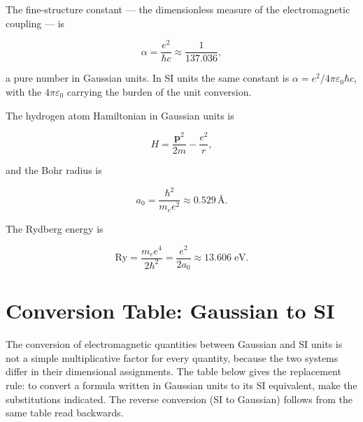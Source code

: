 The fine-structure constant --- the dimensionless measure of the electromagnetic coupling --- is
\begin{linenomath}
    \begin{equation}
        \alpha = \frac{e^2}{\hbar c} \approx \frac{1}{137.036},
        \label{eq:alpha-gaussian}
    \end{equation}
\end{linenomath}
a pure number in Gaussian units. In SI units the same constant is $\alpha = e^2/4\pi\varepsilon_0\hbar c$, with the $4\pi\varepsilon_0$ carrying the burden of the unit conversion.

The hydrogen atom Hamiltonian in Gaussian units is
\begin{linenomath}
    \begin{equation}
        H = \frac{\bm p^2}{2m} - \frac{e^2}{r},
        \label{eq:hydrogen-gaussian}
    \end{equation}
\end{linenomath}
and the Bohr radius is
\begin{linenomath}
    \begin{equation}
        a_0 = \frac{\hbar^2}{m_e e^2} \approx 0.529\,\text{\AA}.
        \label{eq:bohr-gaussian}
    \end{equation}
\end{linenomath}
The Rydberg energy is
\begin{linenomath}
    \begin{equation}
        \mathrm{Ry} = \frac{m_e e^4}{2\hbar^2} = \frac{e^2}{2a_0} \approx 13.606\;\mathrm{eV}.
        \label{eq:rydberg-gaussian}
    \end{equation}
\end{linenomath}

\section{Conversion Table: Gaussian to SI}
\label{sec:conversion-table}

The conversion of electromagnetic quantities between Gaussian and SI units is not a simple multiplicative factor for every quantity, because the two systems differ in their dimensional assignments. The table below gives the replacement rule: to convert a formula written in Gaussian units to its SI equivalent, make the substitutions indicated. The reverse conversion (SI to Gaussian) follows from the same table read backwards.

